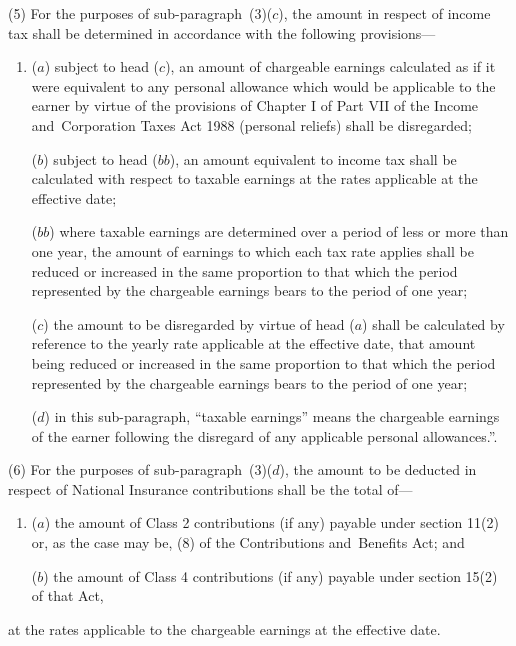 \documentclass[12pt,a4paper]{article}
\begin{document}
(5) For the purposes of sub-paragraph~(3)($c$), the amount in respect of income tax shall be determined in accordance with the following provisions—
\begin{enumerate}\item[]
($a$) subject to head ($c$), an amount of chargeable earnings 
calculated as if it were equivalent to any personal allowance which would be  %
applicable to the earner by virtue of the provisions of Chapter I of Part VII of the Income and~Corporation Taxes Act 1988 (personal reliefs) shall be disregarded;

($b$) 
subject to head ($bb$),  %
an amount equivalent to income tax shall be calculated with respect to taxable earnings at the rates applicable at the effective date;

($bb$) where taxable earnings are determined over a period of less or more than one year, the amount of earnings to which each tax rate applies shall be reduced or increased in the same proportion to that which the period represented by the chargeable earnings bears to the period of one year;

($c$) the amount to be disregarded by virtue of head ($a$) shall be calculated by reference to the yearly rate applicable at the effective date, that amount being reduced or increased in the same proportion to that which the period represented by the chargeable earnings bears to the period of one year;

($d$) in this sub-paragraph, “taxable earnings” means the chargeable earnings of the earner following the disregard of any applicable personal allowances.”.
\end{enumerate}

(6) For the purposes of sub-paragraph~(3)($d$), the amount to be deducted in respect of National Insurance contributions shall be the total of—
\begin{enumerate}\item[]
($a$) the amount of Class 2 contributions (if any) payable under 
section 11(2) or, as the case may be, (8)  %
of the Contributions and~Benefits Act; and

($b$) the amount of Class 4 contributions (if any) payable under section 15(2) of that Act,
\end{enumerate}
at the rates applicable 
to the chargeable earnings %
at the effective date.
\end{document}
